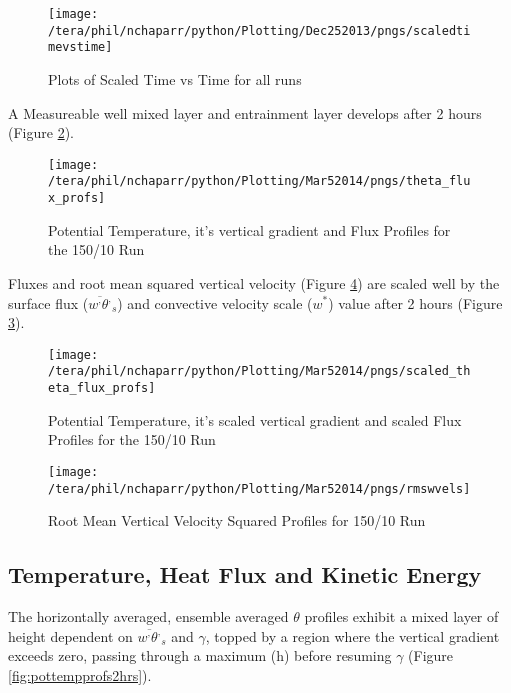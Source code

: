 \begin{figure}[!h]
    \centering
    \texttt{[image: /tera/phil/nchaparr/python/Plotting/Dec252013/pngs/scaledtimevstime]}
    \caption{Plots of Scaled Time vs Time for all runs}
    \label{fig:ScaledTimevsTime}   
\end{figure}

A Measureable well mixed layer and entrainment layer develops after 2 hours (Figure \ref{fig:tempgradfluxprofs15010}).\\

\begin{figure}[htbp]
    \centering
    \texttt{[image: /tera/phil/nchaparr/python/Plotting/Mar52014/pngs/theta\_flux\_profs]}
    \caption{Potential Temperature, it's vertical gradient and Flux Profiles for the 150/10 Run}
    \label{fig:tempgradfluxprofs15010}   %
\end{figure}

Fluxes and root mean squared vertical velocity (Figure \ref{fig:rmswvelprofs15010}) are scaled well by the surface flux ($\overline{w^{,}\theta^{,}}_{s}$) and convective velocity scale ($w^{*}$) value after 2 hours (Figure \ref{fig:scaledtempgradfluxprofs15010}).\\


\begin{figure}[htbp]
    \centering
    \texttt{[image: /tera/phil/nchaparr/python/Plotting/Mar52014/pngs/scaled\_theta\_flux\_profs]}
    \caption{Potential Temperature, it's scaled vertical gradient and scaled Flux Profiles for the 150/10 Run}
    \label{fig:scaledtempgradfluxprofs15010}   %
\end{figure}

\begin{figure}[htbp]
    \centering
    \texttt{[image: /tera/phil/nchaparr/python/Plotting/Mar52014/pngs/rmswvels]}
    \caption{Root Mean Vertical Velocity Squared Profiles for 150/10 Run}
    \label{fig:rmswvelprofs15010}   %
\end{figure}

\subsection{Temperature, Heat Flux and Kinetic Energy}
\FloatBarrier
The horizontally averaged, ensemble averaged $\theta$ profiles exhibit a mixed layer of height dependent on
$\overline{w^{,}\theta^{,}}_{s}$ and $\gamma$, topped by a region where the vertical gradient exceeds zero,
passing through a maximum (h) before resuming $\gamma$ (Figure \ref{fig:pottempprofs2hrs}).\\

